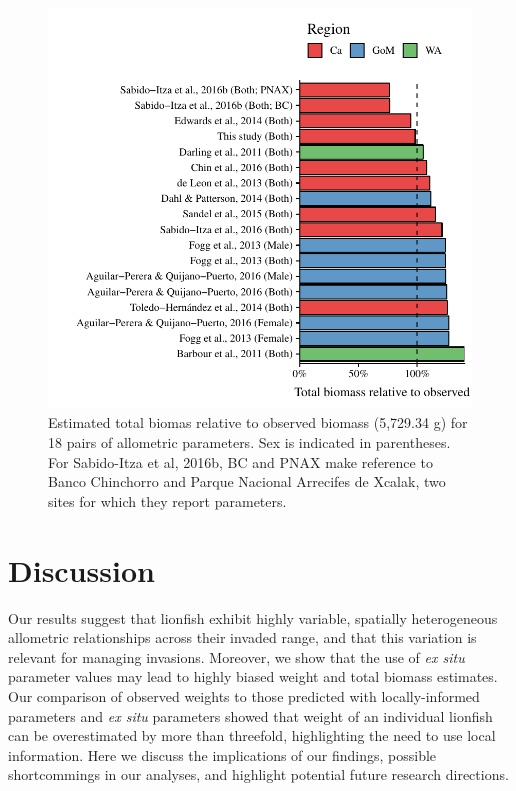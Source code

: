 \documentclass[fleqn,10pt,lineno]{wlpeerj} %
\begin{document}
\begin{figure}
\centering
\includegraphics{Manuscript_files/figure-latex/unnamed-chunk-9-1.pdf}
\caption{\label{fig:errors}Estimated total biomas relative to observed
biomass (5,729.34 g) for 18 pairs of allometric parameters. Sex is
indicated in parentheses. For Sabido-Itza et al, 2016b, BC and PNAX make
reference to Banco Chinchorro and Parque Nacional Arrecifes de Xcalak,
two sites for which they report parameters.}
\end{figure}

\clearpage

\section*{Discussion}

Our results suggest that lionfish exhibit highly variable, spatially
heterogeneous allometric relationships across their invaded range, and
that this variation is relevant for managing invasions. Moreover, we
show that the use of \emph{ex situ} parameter values may lead to highly
biased weight and total biomass estimates. Our comparison of observed
weights to those predicted with locally-informed parameters and \emph{ex
situ} parameters showed that weight of an individual lionfish can be
overestimated by more than threefold, highlighting the need to use local
information. Here we discuss the implications of our findings, possible
shortcommings in our analyses, and highlight potential future research
directions.
\end{document}
